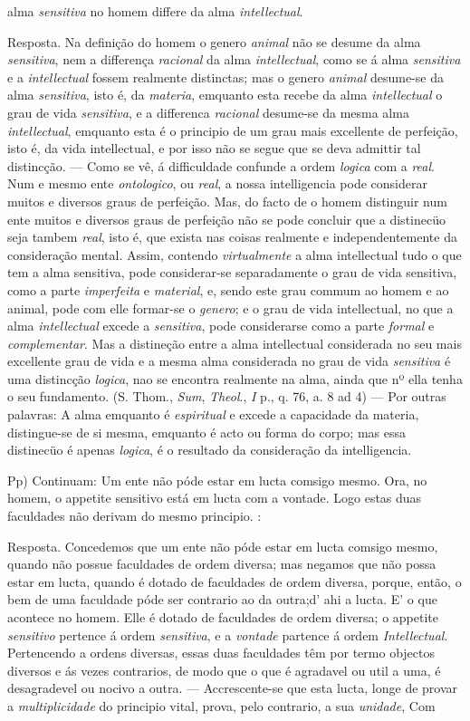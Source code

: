 alma \emph{sensitiva} no homem differe da alma \emph{intellectual}.\par Resposta. Na definição do homem o genero \emph{animal} não se desume da alma \emph{sensitiva}, nem a differença \emph{racional} da alma \emph{intellectual}, como se á alma \emph{sensitiva} e a \emph{intellectual} fossem realmente distinctas; mas o genero \emph{animal} desume-se da alma \emph{sensitiva}, isto é, da \emph{materia}, emquanto esta recebe da alma \emph{intellectual} o grau de vida \emph{sensitiva}, e a differenca \emph{racional} desume-se da mesma alma \emph{intellectual}, emquanto esta é o principio de um grau mais excellente de perfeição, isto é, da vida intellectual, e por isso não se segue que se deva admittir tal distincção. --- Como se vê, á difficuldade confunde a ordem \emph{logica} com a \emph{real}. Num e mesmo ente \emph{ontologico}, ou \emph{real}, a nossa intelligencia pode considerar muitos e diversos graus de perfeição. Mas, do facto de o homem distinguir num ente muitos e diversos graus de perfeição não se pode concluir que a distinecüo seja tambem \emph{real}, isto é, que exista nas coisas realmente e independentemente da consideração mental. Assim, contendo \emph{virtualmente} a alma intellectual tudo o que tem a alma sensitiva, pode considerar-se separadamente o grau de vida sensitiva, como a parte \emph{imperfeita} e \emph{material}, e, sendo este grau commum ao homem e ao animal, pode com elle formar-se o \emph{genero}; e o grau de vida intellectual, no que a alma \emph{intellectual} excede a \emph{sensitiva}, pode considerarse como a parte \emph{formal} e \emph{complementar}. Mas a distineção entre a alma intellectual considerada no seu mais excellente grau de vida e a mesma alma considerada no grau de vida \emph{sensitiva} é uma distincção \emph{logica}, nao se encontra realmente na alma, ainda que nº ella tenha o seu fundamento. (S. Thom., \emph{Sum}, \emph{Theol}., \emph{I} p., q. 76, a. 8 ad 4) --- Por outras palavras: A alma emquanto é \emph{espiritual} e excede a capacidade da materia, distingue-se de si mesma, emquanto é acto ou forma do corpo; mas essa distinecüo é apenas \emph{logica}, é o resultado da consideração da intelligencia.\par Pp) Continuam: Um ente não póde estar em lucta comsigo mesmo. Ora, no homem, o appetite sensitivo está em lucta com a vontade. Logo estas duas faculdades não derivam do mesmo principio. :\par Resposta. Concedemos que um ente não póde estar em lucta comsigo mesmo, quando não possue faculdades de ordem diversa; mas negamos que não possa estar em lucta, quando é dotado de faculdades de ordem diversa, porque, então, o bem de uma faculdade póde ser contrario ao da outra;d' ahi a lucta. E' o que acontece no homem. Elle é dotado de faculdades de ordem diversa; o appetite \emph{sensitivo} pertence á ordem \emph{sensitiva}, e a \emph{vontade} partence á ordem \emph{Intellectual}. Pertencendo a ordens diversas, essas duas faculdades têm por termo objectos diversos e ás vezes contrarios, de modo que o que é agradavel ou util a uma, é desagradevel ou nocivo a outra. --- Accrescente-se que esta lucta, longe de provar a \emph{multiplicidade} do principio vital, prova, pelo contrario, a sua \emph{unidade}, Com 